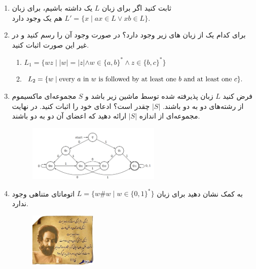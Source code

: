 \documentclass{article}
\begin{document}
	\begin{enumerate}
		\item 
		 ثابت کنید اگر برای زبان $ L $ یک  
		داشته باشیم، برای زبان $L' = \{x \; | \; ax \in L  \vee  xb \in L\}$ هم یک   وجود دارد.
		\item 
		برای کدام یک از زبان های زیر  وجود دارد؟ در صورت وجود آن را رسم کنید و در غیر این صورت اثبات کنید.
		
		\begin{latin}
			\begin{enumerate}
				\item 
				$L_1 = \{wz \; | \; |w|=|z| \wedge w \in \{a,b\}^* \wedge z \in \{b,c\}^* \}$
				\item 
				$L_2 = \{w \; | \; \text{every $a$ in $w$ is followed by at least one $b$ and at least one $ c $}\}. $
				
				
				
			\end{enumerate}
		\end{latin}

		\item 
		فرض کنید $L$ زبان پذیرفته شده توسط ماشین زیر باشد و $ S $ مجموعه‌ای ماکسیموم از رشته‌های دو به دو  باشند. $|S|$ چقدر است؟ ادعای خود را اثبات کنید. در نهایت مجموعه‌ای از اندازه $|S|$ ارائه دهید که اعضای آن دو به دو  باشند.
		\begin{figure}[h]
			\centering
			\includegraphics[width=0.6\textwidth]{image2}
		\end{figure}
	\item 
	 به کمک
	   نشان دهید برای زبان
	 $L = \{w\#w \; |\;  w \in \{0,1\}^* \}$
	  اتوماتای متناهی وجود ندارد.
	  
	\begin{figure}[h]
		\centering
		\includegraphics[width=0.3\textwidth]{image}
	\end{figure}
	\end{enumerate}
\end{document}
